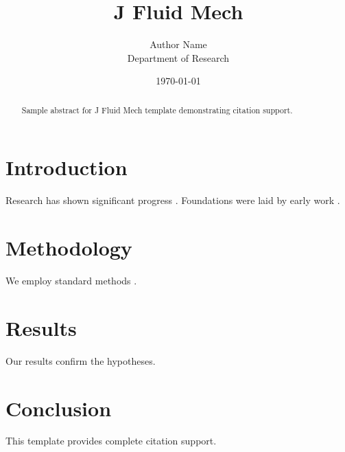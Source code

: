 ﻿\documentclass{elsarticle}
\title{J Fluid Mech}
\author{Author Name \\ \small Department of Research}
\date{\today}
\begin{document}
\maketitle

\begin{abstract}
Sample abstract for J Fluid Mech template demonstrating citation support.
\end{abstract}

\section{Introduction}
Research has shown significant progress \citep{einstein1905}. Foundations were laid by early work \citep{turing1950}.

\section{Methodology}
We employ standard methods \citep{knuth1984}.

\section{Results}
Our results confirm the hypotheses.

\section{Conclusion}
This template provides complete citation support.



\end{document}
